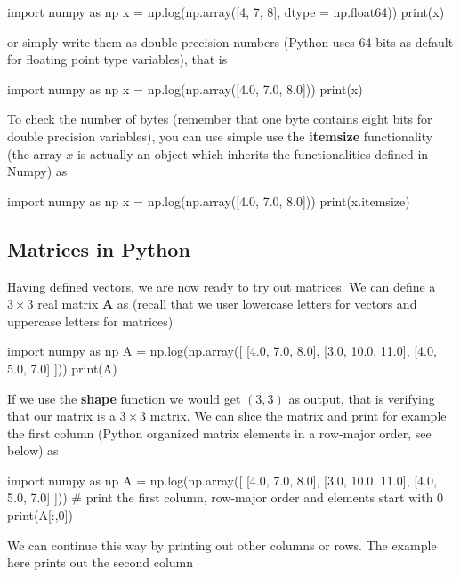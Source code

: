 \documentclass[%
oneside,                 %
final,                   %
10pt]{article}
\begin{document}
\bpycod
import numpy as np
x = np.log(np.array([4, 7, 8], dtype = np.float64))
print(x)

\epycod

or simply write them as double precision numbers (Python uses 64 bits as default for floating point type variables), that is




\bpycod
import numpy as np
x = np.log(np.array([4.0, 7.0, 8.0]))
print(x)

\epycod

To check the number of bytes (remember that one byte contains eight bits for double precision variables), you can use simple use the \textbf{itemsize} functionality (the array $x$ is actually an object which inherits the functionalities defined in Numpy) as 




\bpycod
import numpy as np
x = np.log(np.array([4.0, 7.0, 8.0]))
print(x.itemsize)

\epycod


\subsection{Matrices in Python}

Having defined vectors, we are now ready to try out matrices. We can
define a $3 \times 3 $ real matrix $\bm{A}$ as (recall that we user
lowercase letters for vectors and uppercase letters for matrices)





\bpycod
import numpy as np
A = np.log(np.array([ [4.0, 7.0, 8.0], [3.0, 10.0, 11.0], [4.0, 5.0, 7.0] ]))
print(A)

\epycod

If we use the \textbf{shape} function we would get $(3, 3)$ as output, that is verifying that our matrix is a $3\times 3$ matrix. We can slice the matrix and print for example the first column (Python organized matrix elements in a row-major order, see below) as





\bpycod
import numpy as np
A = np.log(np.array([ [4.0, 7.0, 8.0], [3.0, 10.0, 11.0], [4.0, 5.0, 7.0] ]))
# print the first column, row-major order and elements start with 0
print(A[:,0]) 

\epycod

We can continue this way by printing out other columns or rows. The example here prints out the second column
\end{document}
